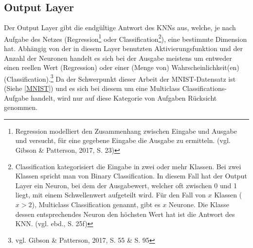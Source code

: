 \documentclass[a4paper,12pt,ngerman,oneside]{scrreprt}	%
\begin{document}
			\subsection{Output Layer}\label{OutputLayer}
			Der Output Layer gibt die endgültige Antwort des KNNs aus, welche, je nach Aufgabe des Netzes (Regression\footnote{Regression modelliert den Zusammenhang zwischen Eingabe und Ausgabe und versucht, für eine gegebene Eingabe die Ausgabe zu ermitteln. (vgl. Gibson \& Patterson, 2017, S. 23)} oder Classification\footnote{Classification kategorisiert die Eingabe in zwei oder mehr Klassen. Bei zwei Klassen spricht man von Binary Classification. In diesem Fall hat der Output Layer ein Neuron, bei dem der Ausgabewert, welcher oft zwischen 0 und 1 liegt, mit einem Schwellenwert aufgeteilt wird. Für den Fall von $x$ Klassen ($x > 2$), Multiclass Classification genannt, gibt es $x$ Neurone. Die Klasse dessen entsprechendes Neuron den höchsten Wert hat ist die Antwort des KNN. (vgl. ebd., S. 25f)}), eine bestimmte Dimension hat. Abhängig von der in diesem Layer benutzten Aktivierungsfunktion und der Anzahl der Neuronen handelt es sich bei der Ausgabe meistens um entweder einen reellen Wert (Regression) oder einer (Menge von) Wahrscheinlichkeit(en) (Classification).\footnote{vgl. Gibson \& Patterson, 2017, S. 55 \& S. 95} Da der Schwerpunkt dieser Arbeit der MNIST-Datensatz ist (Siehe \ref{MNIST}) und es sich bei diesem um eine Multiclass Classifications-Aufgabe handelt, wird nur auf diese Kategorie von Aufgaben Rücksicht genommen. 
	
				
\end{document}
